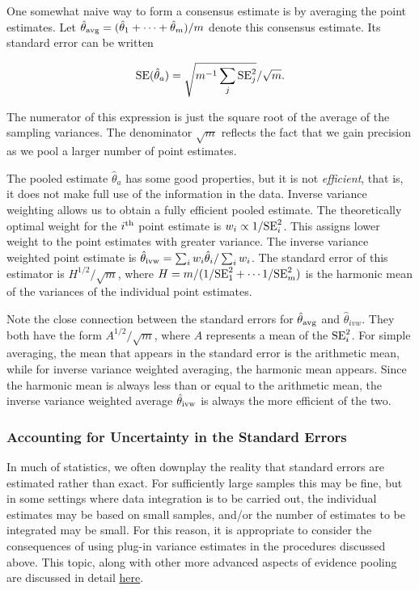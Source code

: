 One somewhat naive way to form a consensus estimate is by averaging the point estimates. Let $\hat{\theta}_{\rm avg} = (\hat{\theta}_1 + \cdots + \hat{\theta}_m)/m$ denote this consensus estimate. Its standard error can be written

$$
{\rm SE}(\hat{\theta}_a) = \sqrt{m^{-1}\sum_j {\rm SE}_j^2} / \sqrt{m}.
$$

\noindent The numerator of this expression is just the square root of the average of the sampling variances. The denominator $\sqrt{m}$ reflects the fact that we gain precision as we pool a larger number of point estimates.

The pooled estimate $\hat{\theta}_a$ has some good properties, but it is not \textit{efficient}, that is, it does not make full use of the information in the data. Inverse variance weighting allows us to obtain a fully efficient pooled estimate. The theoretically optimal weight for the $i^{\rm th}$ point estimate is $w_i \propto 1/{\rm SE}_i^2$. This assigns lower weight to the point estimates with greater variance. The inverse variance weighted point estimate is $\hat{\theta}_{\rm ivw} = \sum_i w_i \hat{\theta}_i / \sum_i w_i$. The standard error of this estimator is $H^{1/2} / \sqrt{m}$, where $H = m/(1/{\rm SE}_1^2 + \cdots 1/{\rm SE}_m^2)$ is the harmonic mean of the variances of the individual point estimates.

Note the close connection between the standard errors for $\hat{\theta}_{\rm avg}$ and $\hat{\theta}_{ivw}$. They both have the form $A^{1/2} / \sqrt{m}$, where $A$ represents a mean of the ${\rm SE}_i^2$. For simple averaging, the mean that appears in the standard error is the arithmetic mean, while for inverse variance weighted averaging, the harmonic mean appears. Since the harmonic mean is always less than or equal to the arithmetic mean, the inverse variance weighted average $\hat{\theta}_{\rm ivw}$ is always the more efficient of the two.

\subsubsection{Accounting for Uncertainty in the Standard Errors}

In much of statistics, we often downplay the reality that standard errors are estimated rather than exact. For sufficiently large samples this may be fine, but in some settings where data integration is to be carried out, the individual estimates may be based on small samples, and/or the number of estimates to be integrated may be small. For this reason, it is appropriate to consider the consequences of using plug-in variance estimates in the procedures discussed above.  This topic, along with other more advanced aspects of evidence pooling are discussed in detail \href{https://onlinelibrary.wiley.com/doi/epdf/10.1002/sim.6632}{here}.

